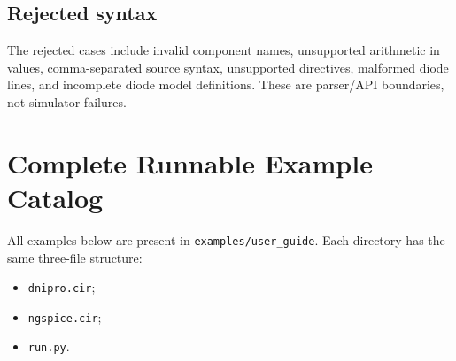 \documentclass[11pt,a4paper]{article}
\newcommand{\code}[1]{\texttt{#1}}
\begin{document}
\subsection{Rejected syntax}

The rejected cases include invalid component names, unsupported arithmetic in
values, comma-separated source syntax, unsupported directives, malformed diode
lines, and incomplete diode model definitions. These are parser/API boundaries,
not simulator failures.

\appendix

\section{Complete Runnable Example Catalog}
\label{app:catalog}

All examples below are present in \code{examples/user\_guide}. Each directory
has the same three-file structure:

\begin{itemize}[noitemsep]
    \item \code{dnipro.cir};
    \item \code{ngspice.cir};
    \item \code{run.py}.
\end{itemize}
\end{document}
